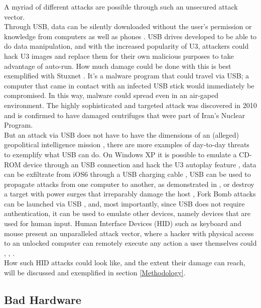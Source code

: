 A myriad of different attacks are possible through such an unsecured attack vector.\\
Through USB, data can be silently downloaded without the user's permission or knowledge from computers \cite{clarkHardwareTrojanHorse2009} as well as phones \cite{SharpIdeasDownloads2006}. USB drives developed to be able to do data manipulation, and with the increased popularity of U3, attackers could hack U3 images and replace them for their own malicious purposes to take advantage of auto-run. 
How much damage could be done with this is best exemplified with Stuxnet \cite{kushnerRealStoryStuxnet2013}. It's a malware program that could travel via USB; a computer that came in contact with an infected USB stick would immediately be compromised. In this way, malware could spread even in an air-gaped environment. The highly sophisticated and targeted attack was discovered in 2010 and is confirmed to have damaged centrifuges that were part of Iran's Nuclear Program.\\
But an attack via USB does not have to have the dimensions of an (alleged) geopolitical intelligence mission \cite{kushnerRealStoryStuxnet2013}, there are more examples of day-to-day threats to exemplify what USB can do. On Windows XP it is possible to emulate a CD-ROM device through an USB connection and hack the U3 autoplay feature \cite{al-zarouniRealityRisksConsented2006}, data can be exfiltrate from iOS6 through a USB charging cable \cite{lauMactansInjectingMalware2013}, USB can be used to propagate attacks from one computer to another, as demonstrated in \cite{wangExploitingSmartphoneUSB2010}, or destroy a target with power surges that irreparably damage the host \cite{USBKillDevices}, Fork Bomb attacks can be launched via USB \cite{efendyExploringPossibilityUSB2019}, and, most importantly, since USB does not require authentication, it can be used to emulate other devices, namely devices that are used for human input. Human Interface Devices (HID) such as keyboard and mouse present an unparalleled attack vector, where a hacker with physical access to an unlocked computer can remotely execute any action a user themselves could \cite{USBRubberDucky}, \cite{MGCable2019a}, \cite{lawalFacilitatingCyberenabledFraud2022}. \\
How such HID attacks could look like, and the extent their damage can reach, will be discussed and exemplified in section \ref{Methodology}.

\subsection{Bad Hardware}

